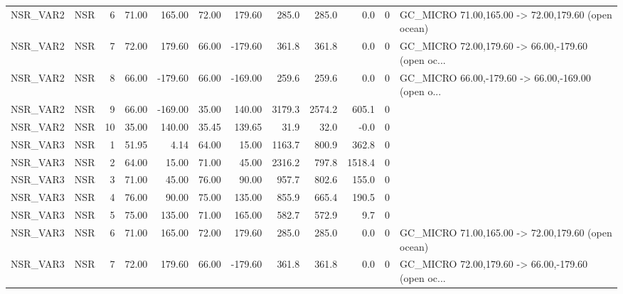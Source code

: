 \begin{tabular}{llrrrrrrrrrl}
 NSR\_VAR2 &      NSR &        6 &     71.00 &    165.00 &   72.00 &  179.60 &   285.0 &  285.0 &              0.0 &           0 & GC\_MICRO 71.00,165.00 -> 72.00,179.60 (open ocean) \\
 NSR\_VAR2 &      NSR &        7 &     72.00 &    179.60 &   66.00 & -179.60 &   361.8 &  361.8 &              0.0 &           0 & GC\_MICRO 72.00,179.60 -> 66.00,-179.60 (open oc... \\
 NSR\_VAR2 &      NSR &        8 &     66.00 &   -179.60 &   66.00 & -169.00 &   259.6 &  259.6 &              0.0 &           0 & GC\_MICRO 66.00,-179.60 -> 66.00,-169.00 (open o... \\
 NSR\_VAR2 &      NSR &        9 &     66.00 &   -169.00 &   35.00 &  140.00 &  3179.3 & 2574.2 &            605.1 &           0 &                                                    \\
 NSR\_VAR2 &      NSR &       10 &     35.00 &    140.00 &   35.45 &  139.65 &    31.9 &   32.0 &             -0.0 &           0 &                                                    \\
 NSR\_VAR3 &      NSR &        1 &     51.95 &      4.14 &   64.00 &   15.00 &  1163.7 &  800.9 &            362.8 &           0 &                                                    \\
 NSR\_VAR3 &      NSR &        2 &     64.00 &     15.00 &   71.00 &   45.00 &  2316.2 &  797.8 &           1518.4 &           0 &                                                    \\
 NSR\_VAR3 &      NSR &        3 &     71.00 &     45.00 &   76.00 &   90.00 &   957.7 &  802.6 &            155.0 &           0 &                                                    \\
 NSR\_VAR3 &      NSR &        4 &     76.00 &     90.00 &   75.00 &  135.00 &   855.9 &  665.4 &            190.5 &           0 &                                                    \\
 NSR\_VAR3 &      NSR &        5 &     75.00 &    135.00 &   71.00 &  165.00 &   582.7 &  572.9 &              9.7 &           0 &                                                    \\
 NSR\_VAR3 &      NSR &        6 &     71.00 &    165.00 &   72.00 &  179.60 &   285.0 &  285.0 &              0.0 &           0 & GC\_MICRO 71.00,165.00 -> 72.00,179.60 (open ocean) \\
 NSR\_VAR3 &      NSR &        7 &     72.00 &    179.60 &   66.00 & -179.60 &   361.8 &  361.8 &              0.0 &           0 & GC\_MICRO 72.00,179.60 -> 66.00,-179.60 (open oc... \\

\end{tabular}
